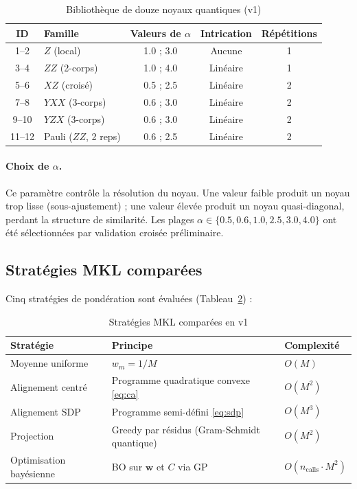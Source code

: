 \documentclass[12pt,a4paper]{article}
\begin{document}
\begin{table}[H]
\centering
\caption{Bibliothèque de douze noyaux quantiques (v1)}
\label{tab:v1_kernels}
\begin{tabular}{@{}clccc@{}}
\toprule
\textbf{ID} & \textbf{Famille} & \textbf{Valeurs de $\alpha$} & \textbf{Intrication} & \textbf{Répétitions} \\
\midrule
1--2  & $Z$ (local)            & 1.0 ; 3.0       & Aucune   & 1 \\
3--4  & $ZZ$ (2-corps)         & 1.0 ; 4.0       & Linéaire & 1 \\
5--6  & $XZ$ (croisé)          & 0.5 ; 2.5       & Linéaire & 2 \\
7--8  & $YXX$ (3-corps)        & 0.6 ; 3.0       & Linéaire & 2 \\
9--10 & $YZX$ (3-corps)        & 0.6 ; 3.0       & Linéaire & 2 \\
11--12 & Pauli ($ZZ$, 2 reps)  & 0.6 ; 2.5       & Linéaire & 2 \\
\bottomrule
\end{tabular}
\end{table}

\paragraph{Choix de $\alpha$.}
Ce paramètre contrôle la résolution du noyau.
Une valeur faible produit un noyau trop lisse (sous-ajustement) ;
une valeur élevée produit un noyau quasi-diagonal, perdant la structure
de similarité.
Les plages $\alpha \in \{0.5, 0.6, 1.0, 2.5, 3.0, 4.0\}$ ont été
sélectionnées par validation croisée préliminaire.

\subsection{Stratégies MKL comparées}

Cinq stratégies de pondération sont évaluées (Tableau~\ref{tab:v1_strategies}) :

\begin{table}[H]
\centering
\caption{Stratégies MKL comparées en v1}
\label{tab:v1_strategies}
\begin{tabular}{@{}lll@{}}
\toprule
\textbf{Stratégie} & \textbf{Principe} & \textbf{Complexité} \\
\midrule
Moyenne uniforme & $w_m = 1/M$ & $O(M)$ \\
Alignement centré & Programme quadratique convexe \eqref{eq:ca} & $O(M^2)$ \\
Alignement SDP & Programme semi-défini \eqref{eq:sdp} & $O(M^3)$ \\
Projection & Greedy par résidus (Gram-Schmidt quantique) & $O(M^2)$ \\
Optimisation bayésienne & BO sur $\bm{w}$ et $C$ via GP & $O(n_{\mathrm{calls}} \cdot M^2)$ \\
\bottomrule
\end{tabular}
\end{table}
\end{document}
